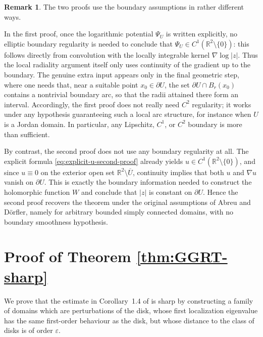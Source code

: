 \documentclass[a4paper,11pt,reqno]{amsart}
\numberwithin{equation}{section}
\theoremstyle{plain} %
\theoremstyle{definition} %
\newtheorem{remark}{Remark}[section]
\theoremstyle{remark}
\newcommand{\R}{\mathbb{R}}
\begin{document}
\begin{remark}
The two proofs use the boundary assumptions in rather different ways.

In the first proof, once the logarithmic potential \(\Psi_U\) is written explicitly, no elliptic
boundary regularity is needed to conclude that \(\Psi_U\in C^1(\R^2\setminus\{0\})\): this follows
directly from convolution with the locally integrable kernel \(\nabla\log|z|\). Thus the local
radiality argument itself only uses continuity of the gradient up to the boundary. The genuine
extra input appears only in the final geometric step, where one needs that, near a suitable point
\(x_0\in \partial U\), the set \(\partial U\cap B_r(x_0)\) contains a nontrivial boundary arc, so
that the radii attained there form an interval. Accordingly, the first proof does not really need
\(C^2\) regularity; it works under any hypothesis guaranteeing such a local arc structure, for
instance when \(U\) is a Jordan domain. In particular, any Lipschitz, \(C^1\), or \(C^2\) boundary
is more than sufficient.

By contrast, the second proof does not use any boundary regularity at all. The explicit formula
\eqref{eq:explicit-u-second-proof} already yields \(u\in C^1(\R^2\setminus\{0\})\), and since
\(u\equiv 0\) on the exterior open set \(\R^2\setminus \overline U\), continuity implies that both
\(u\) and \(\nabla u\) vanish on \(\partial U\). This is exactly the boundary information needed to
construct the holomorphic function \(W\) and conclude that \(|z|\) is constant on \(\partial U\).
Hence the second proof recovers the theorem under the original assumptions of Abreu and D\"orfler,
namely for arbitrary bounded simply connected domains, with no boundary smoothness hypothesis. 
\end{remark}

\section{Proof of Theorem \ref{thm:GGRT-sharp}}

We prove that the estimate in Corollary~1.4 of \cite{Gomez-Guerra-Ramos-Tilli}
is sharp by constructing a family of domains which are perturbations of the disk,
whose first localization eigenvalue has the same first-order behaviour as the
disk, but whose distance to the class of disks is of order $\varepsilon$.
\end{document}
